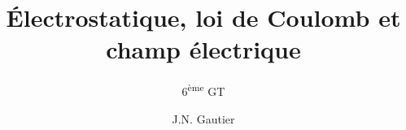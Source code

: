 

\subject{Physique(2h)}
\title{\Huge{Électrostatique, loi de Coulomb et champ électrique}}
\subtitle{6\textsuperscript{ème} GT}
\author {J.N. Gautier}
\date{}


\maketitle




\tableofcontents

